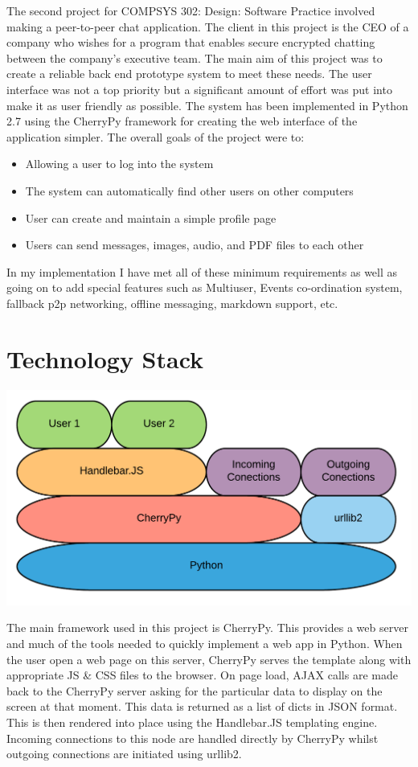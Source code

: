 \documentclass[a4paper,10pt,twoside]{article}
\begin{document}
The second project for COMPSYS 302: Design: Software Practice involved making a peer-to-peer chat application. The client in this project is the CEO of a company who wishes for a program that enables secure encrypted chatting between the company's executive team. The main aim of this project was to create a reliable back end prototype system to meet these needs. The user interface was not a top priority but a significant amount of effort was put into make it as user friendly as possible. The system has been implemented in Python 2.7 using the CherryPy framework for creating the web interface of the application simpler.  The overall goals of the project were to:

\begin{itemize}
\item Allowing a user to log into the system
\item The system can automatically find other users on other computers
\item User can create and maintain a simple profile page
\item Users can send messages, images, audio, and PDF files to each other
\end{itemize}

In my implementation I have met all of these minimum requirements as well as going on to add special features such as Multiuser, Events co-ordination system, fallback p2p networking, offline messaging, markdown support, etc.

\section{Technology Stack}

\includegraphics[width=1\textwidth]{tech_stack.png}

The main framework used in this project is CherryPy. This provides a web server and much of the tools needed to quickly implement a web app in Python. When the user open a web page on this server, CherryPy serves the template along with appropriate JS \& CSS files to the browser. On page load, AJAX calls are made back to the CherryPy server asking for the particular data to display on the screen at that moment. This data is returned as a list of dicts in JSON format. This is then rendered into place using the Handlebar.JS templating engine. Incoming connections to this node are handled directly by CherryPy whilst outgoing connections are initiated using urllib2.
\end{document}
